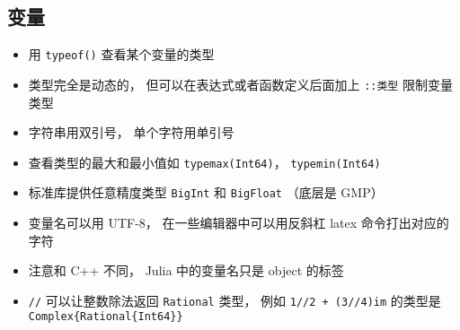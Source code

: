 \subsection{变量}
\begin{itemize}
\item 用 \verb|typeof()| 查看某个变量的类型
\item 类型完全是动态的， 但可以在表达式或者函数定义后面加上 \verb|::类型| 限制变量类型
\item 字符串用双引号， 单个字符用单引号
\item 查看类型的最大和最小值如 \verb|typemax(Int64)|， \verb|typemin(Int64)|
\item 标准库提供任意精度类型 \verb|BigInt| 和 \verb|BigFloat| （底层是 GMP）
\item 变量名可以用 UTF-8， 在一些编辑器中可以用反斜杠 latex 命令打出对应的字符
\item 注意和 C++ 不同， Julia 中的变量名只是 object 的标签
\item \verb|//| 可以让整数除法返回 \verb|Rational| 类型， 例如 \verb|1//2 + (3//4)im| 的类型是 \verb|Complex{Rational{Int64}}|
\end{itemize}

